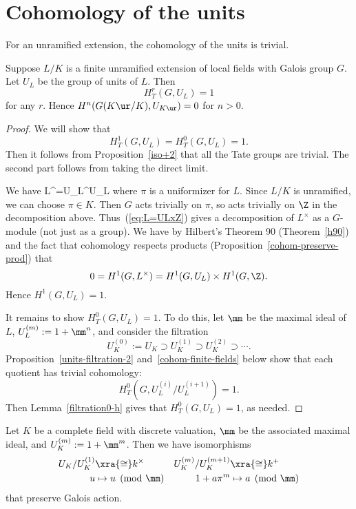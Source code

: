 \section{Cohomology of the units}
For an unramified extension, the cohomology of the units is trivial.
\begin{thm}
Suppose $L/K$ is a finite unramified extension of local fields with Galois group $G$. Let $U_L$ be the group of units of $L$. Then 
\[
H_T^r(G,U_L)=1
\]
for any $r$. Hence $H^n(G(K\ur/K),U_{K\ur})=0$ for $n>0$.
\end{thm}
\begin{proof}
We will show that
\[
H_T^1(G,U_L)=H_T^0(G,U_L)=1.
\]
Then it follows from Proposition~\ref{iso+2} that all the Tate groups are trivial. The second part follows from taking the direct limit. %

We have
L^{\times}=U_L\times \pi^{\Z}\cong U_L\times \Z
\eeq
where $\pi$ is a uniformizer for $L$. Since $L/K$ is unramified, we can choose $\pi \in K$. Then $G$ acts trivially on $\pi$, so acts trivially on $\Z$ in the decomposition above. Thus~(\ref{eq:L=ULxZ}) gives a decomposition of $L^{\times}$ as a $G$-module (not just as a group). We have by Hilbert's Theorem 90 (Theorem~\ref{h90}) and the fact that cohomology respects products (Proposition~\ref{cohom-preserve-prod}) that
\[
0= H^1(G,L^{\times})=H^1(G,U_L)\times H^1(G,\Z).
\]
Hence $H^1(G,U_L)=1$.

It remains to show $H_T^0(G,U_L)=1$. To do this, let $\mm$ be the maximal ideal of $L$, $U_L^{(m)}:=1+\mm^n$, and consider the filtration
\[
U_K^{(0)}:=U_K\supset U_K^{(1)}\supset U_K^{(2)}\supset \cdots.
\]
Proposition~\ref{units-filtration-2} and~\ref{cohom-finite-fields} below show that each quotient has trivial cohomology:
\[
H_T^0(G,U_L^{(i)}/U_L^{(i+1)})=1.
\]
Then Lemma~\ref{filtration0-h} gives that $H_T^0(G,U_L)=1$, as needed.
\end{proof}
\begin{pr}
Let $K$ be a complete field with discrete valuation, $\mm$ be the associated maximal ideal, and $U_K^{(m)}:=1+\mm^m$. Then we have isomorphisms
\begin{align*}
U_K/U_K^{(1)}&\xra{\cong} k^{\times}&
U_K^{(m)}/U_K^{(m+1)}&\xra{\cong} k^+\\
u&\mapsto u\pmod{\mm}&
1+a\pi^m&\mapsto a\pmod{\mm}
\end{align*}
that preserve Galois action.
\end{pr}
